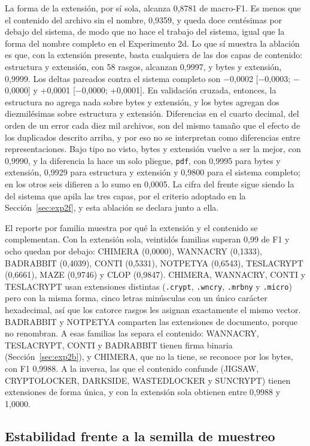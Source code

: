 La forma de la extensión, por sí sola, alcanza 0,8781 de macro-F1. Es menos que el contenido del archivo sin el nombre, 0,9359, y queda doce centésimas por debajo del sistema, de modo que no hace el trabajo del sistema, igual que la forma del nombre completo en el Experimento 2d. Lo que sí muestra la ablación es que, con la extensión presente, basta cualquiera de las dos capas de contenido: estructura y extensión, con 58 rasgos, alcanzan 0,9997, y bytes y extensión, 0,9999. Los deltas pareados contra el sistema completo son $-$0,0002 [$-$0,0003; $-$0,0000] y +0,0001 [$-$0,0000; +0,0001]. En validación cruzada, entonces, la estructura no agrega nada sobre bytes y extensión, y los bytes agregan dos diezmilésimas sobre estructura y extensión. Diferencias en el cuarto decimal, del orden de un error cada diez mil archivos, son del mismo tamaño que el efecto de los duplicados descrito arriba, y por eso no se interpretan como diferencias entre representaciones. Bajo tipo no visto, bytes y extensión vuelve a ser la mejor, con 0,9990, y la diferencia la hace un solo pliegue, \texttt{pdf}, con 0,9995 para bytes y extensión, 0,9929 para estructura y extensión y 0,9800 para el sistema completo; en los otros seis difieren a lo sumo en 0,0005. La cifra del frente sigue siendo la del sistema que apila las tres capas, por el criterio adoptado en la Sección~\ref{sec:exp2f}, y esta ablación se declara junto a ella.

El reporte por familia muestra por qué la extensión y el contenido se complementan. Con la extensión sola, veintidós familias superan 0,99 de F1 y ocho quedan por debajo: CHIMERA (0,0000), WANNACRY (0,1333), BADRABBIT (0,4039), CONTI (0,5331), NOTPETYA (0,6543), TESLACRYPT (0,6661), MAZE (0,9746) y CLOP (0,9847). CHIMERA, WANNACRY, CONTI y TESLACRYPT usan extensiones distintas (\texttt{.crypt}, \texttt{.wncry}, \texttt{.mrbny} y \texttt{.micro}) pero con la misma forma, cinco letras minúsculas con un único carácter hexadecimal, así que los catorce rasgos les asignan exactamente el mismo vector. BADRABBIT y NOTPETYA comparten las extensiones de documento, porque no renombran. A esas familias las separa el contenido: WANNACRY, TESLACRYPT, CONTI y BADRABBIT tienen firma binaria (Sección~\ref{sec:exp2b}), y CHIMERA, que no la tiene, se reconoce por los bytes, con F1 0,9988. A la inversa, las que el contenido confunde (JIGSAW, CRYPTOLOCKER, DARKSIDE, WASTEDLOCKER y SUNCRYPT) tienen extensiones de forma única, y con la extensión sola obtienen entre 0,9988 y 1,0000.

\subsection{Estabilidad frente a la semilla de muestreo}

